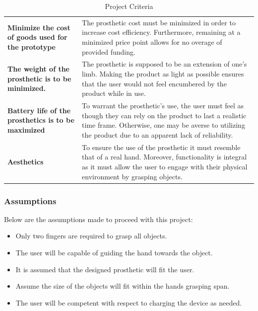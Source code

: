 \documentclass[11.5pt]{article}
\begin{document}
\begin{table}[H]
\centering
\caption{Project Criteria}
\vspace{3mm}
\begin{tabular}{|>{\arraybackslash}m{7.5cm}|>{\arraybackslash}m{7.5cm}|}
\hline
    \multicolumn{1}{|c|}{Criteria}  & \multicolumn{1}{c|}{Description} \\ \hline
    
    \textbf{Minimize the cost of goods used for the prototype} & The prosthetic cost must be minimized in order to increase cost efficiency. Furthermore, remaining at a minimized price point allows for no overage of provided funding.\\\hline
    
    \textbf{The weight of the prosthetic is to be minimized.} & The prosthetic is supposed to be an extension of one’s limb. Making the product as light as possible ensures that the user would not feel encumbered by the product while in use.  \\\hline
    
     \textbf{Battery life of the prosthetics is to be maximized} & To warrant the prosthetic’s use, the user must feel as though they can rely on the product to last a realistic time frame. Otherwise, one may be averse to utilizing the product due to an apparent lack of reliability. \\\hline
    
    \textbf{Aesthetics} & To ensure the use of the prosthetic it must resemble that of a real hand. Moreover, functionality is integral as it must allow the user to engage with their physical environment by grasping objects.\\\hline
    
\end{tabular}
\label{tab:criteria}
\end{table}

\newpage
\subsubsection{Assumptions}

Below are the assumptions made to proceed with this project:

\begin{itemize}
    \item Only two fingers are required to grasp all objects.
    \item The user will be capable of guiding the hand towards the object. 
    \item It is assumed that the designed prosthetic will fit the user. 
    \item Assume the size of the objects will fit within the hands grasping span.
    \item The user will be competent with respect to charging the device as needed.
\end{itemize}
\end{document}
